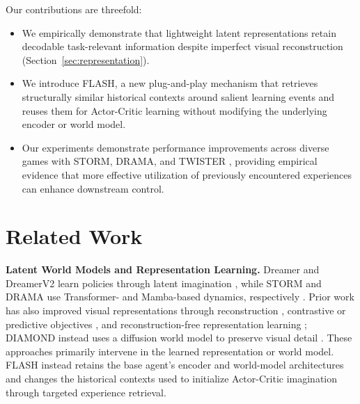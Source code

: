 \documentclass{article} %
\begin{document}
Our contributions are threefold:
\begin{itemize}
    \item We empirically demonstrate that lightweight latent representations retain decodable task-relevant information despite imperfect visual reconstruction (Section~\ref{sec:representation}).
    \item We introduce FLASH, a new plug-and-play mechanism that retrieves structurally similar historical contexts around salient learning events and reuses them for Actor-Critic learning without modifying the underlying encoder or world model.

    \item Our experiments demonstrate performance improvements across diverse games with STORM, DRAMA, and TWISTER \citep{zhang2023storm, wang2025drama, burchi2025learning}, providing empirical evidence that more effective utilization of previously encountered experiences can enhance downstream control.
\end{itemize}

\section{Related Work}
\label{sec:related}

\textbf{Latent World Models and Representation Learning.}
Dreamer and DreamerV2 learn policies through latent imagination \citep{hafner2019dream, hafner2020mastering}, while STORM and DRAMA use Transformer- and Mamba-based dynamics, respectively \citep{zhang2023storm, wang2025drama}. Prior work has also improved visual representations through reconstruction \citep{hafner2019learning}, contrastive or predictive objectives \citep{laskin2020curl, schwarzer2020data}, and reconstruction-free representation learning \citep{stooke2021decoupling, deng2022dreamerpro}; DIAMOND instead uses a diffusion world model to preserve visual detail \citep{alonso2024diffusion}. These approaches primarily intervene in the learned representation or world model. FLASH instead retains the base agent's encoder and world-model architectures and changes the historical contexts used to initialize Actor-Critic imagination through targeted experience retrieval. 
\end{document}
